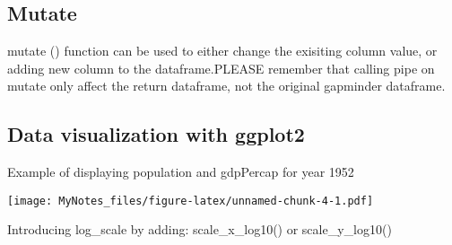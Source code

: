 \documentclass[]{article}
\newenvironment{Shaded}{\begin{snugshade}}{\end{snugshade}}
\newcommand{\KeywordTok}[1]{\textcolor[rgb]{0.13,0.29,0.53}{\textbf{#1}}}
\newcommand{\DataTypeTok}[1]{\textcolor[rgb]{0.13,0.29,0.53}{#1}}
\newcommand{\DecValTok}[1]{\textcolor[rgb]{0.00,0.00,0.81}{#1}}
\newcommand{\StringTok}[1]{\textcolor[rgb]{0.31,0.60,0.02}{#1}}
\newcommand{\CommentTok}[1]{\textcolor[rgb]{0.56,0.35,0.01}{\textit{#1}}}
\newcommand{\OperatorTok}[1]{\textcolor[rgb]{0.81,0.36,0.00}{\textbf{#1}}}
\newcommand{\NormalTok}[1]{#1}
\begin{document}
\subsection{Mutate}\label{mutate}

mutate () function can be used to either change the exisiting column
value, or adding new column to the dataframe.PLEASE remember that
calling pipe on mutate only affect the return dataframe, not the
original gapminder dataframe.

\subsection{Data visualization with
ggplot2}\label{data-visualization-with-ggplot2}

Example of displaying population and gdpPercap for year 1952

\begin{Shaded}
\end{Shaded}

\texttt{[image: MyNotes\_files/figure-latex/unnamed-chunk-4-1.pdf]}

Introducing log\_scale by adding: scale\_x\_log10() or scale\_y\_log10()

\begin{Shaded}
\end{Shaded}
\end{document}
